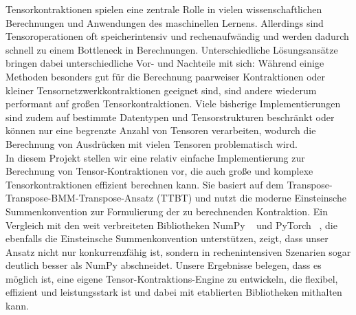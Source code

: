 Tensorkontraktionen spielen eine zentrale Rolle in vielen wissenschaftlichen Berechnungen und Anwendungen des maschinellen Lernens. Allerdings sind Tensoroperationen oft speicherintensiv und rechenaufwändig und werden dadurch schnell zu einem Bottleneck in Berechnungen. 
Unterschiedliche Lösungsansätze bringen dabei unterschiedliche Vor- und Nachteile mit sich: Während einige Methoden besonders gut für die Berechnung paarweiser Kontraktionen oder kleiner Tensornetzwerkkontraktionen geeignet sind, sind andere wiederum performant auf großen Tensorkontraktionen.
Viele bisherige Implementierungen sind zudem auf bestimmte Datentypen und Tensorstrukturen beschränkt oder können nur eine begrenzte Anzahl von Tensoren verarbeiten, wodurch die Berechnung von Ausdrücken mit vielen Tensoren problematisch wird.\\

\noindent In diesem Projekt stellen wir eine relativ einfache Implementierung zur Berechnung von Tensor-Kontraktionen vor, die auch große und komplexe Tensorkontraktionen effizient berechnen kann. Sie basiert auf dem Transpose-Transpose-BMM-Transpose-Ansatz (TTBT) und nutzt die moderne Einsteinsche Summenkonvention zur Formulierung der zu berechnenden Kontraktion.
Ein Vergleich mit den weit verbreiteten Bibliotheken NumPy ~\cite{Numpy} und PyTorch ~\cite{PyTorch}, die ebenfalls die Einsteinsche Summenkonvention unterstützen, zeigt, dass unser Ansatz nicht nur konkurrenzfähig ist, sondern in rechenintensiven Szenarien sogar deutlich besser als NumPy abschneidet. Unsere Ergebnisse belegen, dass es möglich ist, eine eigene Tensor-Kontraktions-Engine zu entwickeln, die flexibel, effizient und leistungsstark ist und dabei mit etablierten Bibliotheken mithalten kann.